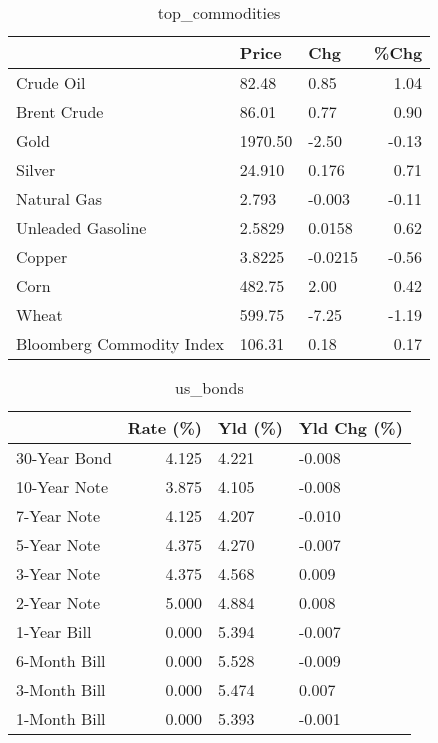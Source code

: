\documentclass{article}%
\begin{document}
\begin{table}[htbp]%
\caption{top\_commodities}%
\centering%
\begin{adjustbox}{width=1\textwidth}%
\begin{tabular}{lllr}
\toprule
                          &   Price &     Chg &  \%Chg \\
\midrule
               Crude Oil  &   82.48 &    0.85 &  1.04 \\
             Brent Crude  &   86.01 &    0.77 &  0.90 \\
                    Gold  & 1970.50 &   -2.50 & -0.13 \\
                  Silver  &  24.910 &   0.176 &  0.71 \\
             Natural Gas  &   2.793 &  -0.003 & -0.11 \\
       Unleaded Gasoline  &  2.5829 &  0.0158 &  0.62 \\
                  Copper  &  3.8225 & -0.0215 & -0.56 \\
                    Corn  &  482.75 &    2.00 &  0.42 \\
                   Wheat  &  599.75 &   -7.25 & -1.19 \\
Bloomberg Commodity Index &  106.31 &    0.18 &  0.17 \\
\bottomrule
\end{tabular}
%
\end{adjustbox}%
\end{table}

%


\begin{table}[htbp]%
\caption{us\_bonds}%
\centering%
\begin{adjustbox}{width=1\textwidth}%
\begin{tabular}{lrll}
\toprule
             &  Rate (\%) & Yld (\%) & Yld Chg (\%) \\
\midrule
30-Year Bond &     4.125 &   4.221 &      -0.008 \\
10-Year Note &     3.875 &   4.105 &      -0.008 \\
 7-Year Note &     4.125 &   4.207 &      -0.010 \\
 5-Year Note &     4.375 &   4.270 &      -0.007 \\
 3-Year Note &     4.375 &   4.568 &       0.009 \\
 2-Year Note &     5.000 &   4.884 &       0.008 \\
 1-Year Bill &     0.000 &   5.394 &      -0.007 \\
6-Month Bill &     0.000 &   5.528 &      -0.009 \\
3-Month Bill &     0.000 &   5.474 &       0.007 \\
1-Month Bill &     0.000 &   5.393 &      -0.001 \\
\bottomrule
\end{tabular}
%
\end{adjustbox}%
\end{table}
\end{document}
